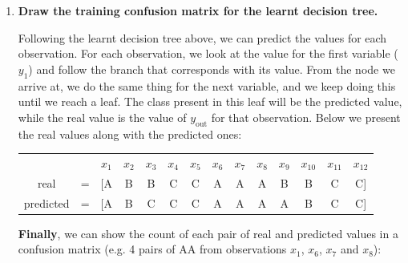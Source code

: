 \documentclass[12pt]{article}
\begin{document}
\begin{enumerate}[leftmargin=\labelsep]
  \item \textbf{Draw the training confusion matrix for the learnt decision tree.}

        \vskip 0.3cm
        Following the learnt decision tree above, we can predict the values for each observation.
        For each observation, we look at the value for the first variable ($y_1$) and follow the branch that corresponds with its value.
        From the node we arrive at, we do the same thing for the next variable, and we keep doing this until we reach a leaf.
        The class present in this leaf will be the predicted value, while the real value is the value of $y_{\text{out}}$ for that observation.
        Below we present the real values along with the predicted ones:

        \begin{center}
          \begin{tabular}{cccccccccccccc}
            \multicolumn{2}{c}{}       & $x_1$ & $x_2$ & $x_3$ & $x_4$ & $x_5$ & $x_6$ & $x_7$ & $x_8$ & $x_9$ & $x_{10}$ & $x_{11}$ & $x_{12}$      \\
            \multirow{1}{*}{real}      & =     & [A    & B     & B     & C     & C     & A     & A     & A     & B        & B        & C        & C] \\
            \multirow{1}{*}{predicted} & =     & [A    & B     & C     & C     & C     & A     & A     & A     & A        & B        & C        & C]
          \end{tabular}
        \end{center}

        \textbf{Finally}, we can show the count of each pair of real and predicted values in a confusion matrix (e.g. 4 pairs of AA from observations $x_1$, $x_6$, $x_7$ and $x_8$):


\end{enumerate}
\end{document}
